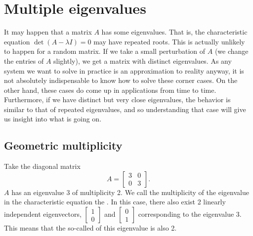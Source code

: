 
\sectionnewpage
\section{Multiple eigenvalues} \label{sec:multeigen}



It may happen that a matrix $A$ has some  eigenvalues.
That is, the characteristic equation $\det(A-\lambda I) = 0$ may have
repeated roots.  This is actually unlikely to happen
for a random matrix.  If we take a small perturbation of $A$ (we change the
entries of $A$ slightly), we get a matrix with distinct eigenvalues.  As
any system we want to solve in practice is an approximation to reality
anyway, it is not absolutely indispensable to know how to solve these
corner cases.  
On the other hand, these cases do come up in applications from time to time.
Furthermore, if we have distinct but very close eigenvalues, the behavior is
similar to that of repeated eigenvalues, and so understanding that case
will give us insight into what is going on.

\subsection{Geometric multiplicity}

Take the diagonal matrix
\begin{equation*}
A =
\begin{bmatrix}
3 & 0 \\ 0 & 3
\end{bmatrix} .
\end{equation*}
$A$ has an eigenvalue 3 of multiplicity 2.  We call the
multiplicity of the eigenvalue
in the characteristic equation the
\emph{}.  In this case, there also exist 2
linearly
independent eigenvectors,
$\left[ \begin{smallmatrix} 1 \\ 0 \end{smallmatrix} \right]$
and
$\left[ \begin{smallmatrix} 0 \\ 1 \end{smallmatrix} \right]$ corresponding
to the eigenvalue 3.  This means
that the so-called \emph{}
of this eigenvalue is also 2.

